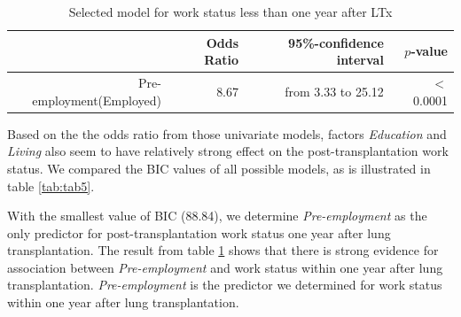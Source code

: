 \documentclass[11pt, a4paper]{article}\usepackage[]{graphicx}\usepackage[]{color}
\begin{document}
{%
\begin{table}[ht]
\centering
\caption{Model selection for 
                   work status within one year after LTx} 
\label{tab:tab5}
\end{table}



\begin{table}[!h]
\centering
\caption{Selected model for work status 
                less than one year after LTx} 
\label{tab:tab6}
\begingroup\footnotesize
\begin{tabular}{rrrr}
  \hline
 & Odds Ratio & 95\%-confidence interval & $p$-value \\ 
  \hline
Pre-employment(Employed) & 8.67 & from 3.33 to 25.12 & $<$ 0.0001 \\ 
   \hline
\end{tabular}
\endgroup
\end{table}


Based on the the odds ratio from those univariate models, factors \textit{Education} and \textit{Living} also seem to have relatively strong effect on the post-transplantation work status. We compared the BIC values of all possible models, as is illustrated in table \ref{tab:tab5}.

With the smallest value of BIC (88.84), we determine \textit{Pre-employment} as the only  predictor for post-transplantation work status one year after lung transplantation. The result from table \ref{tab:tab6} shows that there is strong evidence for association between \textit{Pre-employment} and work status within one year after lung transplantation. \textit{Pre-employment} is the predictor we determined for work status within one year after lung transplantation.

\vspace*{1cm}

}
\end{document}
